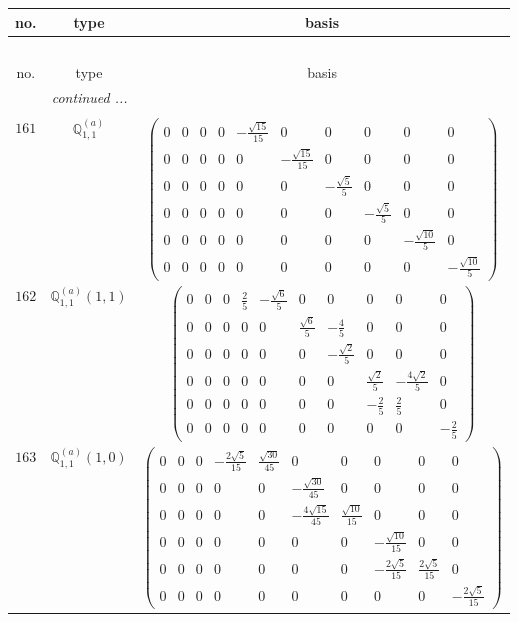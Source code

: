 \documentclass[fleqn,8pt,landscape]{jsarticle}
\begin{document}
\begin{center}
\renewcommand{\arraystretch}{1.6}
\begin{longtable}{ccc}
 \hline \hline
no. & type & basis \\ \hline \endfirsthead

\multicolumn{2}{l}{\tablename\ \thetable{}} \\
 \hline \hline
no. & type & basis \\ \hline \endhead

 \hline \hline
\multicolumn{2}{r}{\footnotesize\it continued ...} \\ \endfoot

 \hline \hline
\multicolumn{2}{r}{} \\ \endlastfoot

$ 161 $ & $ \mathbb{Q}_{1,1}^{(a)} $ & $ \begin{pmatrix} 0 & 0 & 0 & 0 & - \frac{\sqrt{15}}{15} & 0 & 0 & 0 & 0 & 0 \\ 0 & 0 & 0 & 0 & 0 & - \frac{\sqrt{15}}{15} & 0 & 0 & 0 & 0 \\ 0 & 0 & 0 & 0 & 0 & 0 & - \frac{\sqrt{5}}{5} & 0 & 0 & 0 \\ 0 & 0 & 0 & 0 & 0 & 0 & 0 & - \frac{\sqrt{5}}{5} & 0 & 0 \\ 0 & 0 & 0 & 0 & 0 & 0 & 0 & 0 & - \frac{\sqrt{10}}{5} & 0 \\ 0 & 0 & 0 & 0 & 0 & 0 & 0 & 0 & 0 & - \frac{\sqrt{10}}{5} \end{pmatrix} $ \\ \hline
$ 162 $ & $ \mathbb{Q}_{1,1}^{(a)}(1,1) $ & $ \begin{pmatrix} 0 & 0 & 0 & \frac{2}{5} & - \frac{\sqrt{6}}{5} & 0 & 0 & 0 & 0 & 0 \\ 0 & 0 & 0 & 0 & 0 & \frac{\sqrt{6}}{5} & - \frac{4}{5} & 0 & 0 & 0 \\ 0 & 0 & 0 & 0 & 0 & 0 & - \frac{\sqrt{2}}{5} & 0 & 0 & 0 \\ 0 & 0 & 0 & 0 & 0 & 0 & 0 & \frac{\sqrt{2}}{5} & - \frac{4 \sqrt{2}}{5} & 0 \\ 0 & 0 & 0 & 0 & 0 & 0 & 0 & - \frac{2}{5} & \frac{2}{5} & 0 \\ 0 & 0 & 0 & 0 & 0 & 0 & 0 & 0 & 0 & - \frac{2}{5} \end{pmatrix} $ \\ \hline
$ 163 $ & $ \mathbb{Q}_{1,1}^{(a)}(1,0) $ & $ \begin{pmatrix} 0 & 0 & 0 & - \frac{2 \sqrt{5}}{15} & \frac{\sqrt{30}}{45} & 0 & 0 & 0 & 0 & 0 \\ 0 & 0 & 0 & 0 & 0 & - \frac{\sqrt{30}}{45} & 0 & 0 & 0 & 0 \\ 0 & 0 & 0 & 0 & 0 & - \frac{4 \sqrt{15}}{45} & \frac{\sqrt{10}}{15} & 0 & 0 & 0 \\ 0 & 0 & 0 & 0 & 0 & 0 & 0 & - \frac{\sqrt{10}}{15} & 0 & 0 \\ 0 & 0 & 0 & 0 & 0 & 0 & 0 & - \frac{2 \sqrt{5}}{15} & \frac{2 \sqrt{5}}{15} & 0 \\ 0 & 0 & 0 & 0 & 0 & 0 & 0 & 0 & 0 & - \frac{2 \sqrt{5}}{15} \end{pmatrix} $ \\ \hline

\end{longtable}
\end{center}
\end{document}
